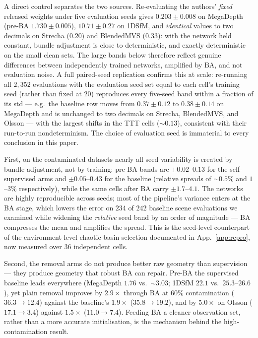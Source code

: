 \documentclass{article}
\begin{document}
A direct control separates the two sources. Re-evaluating the authors' \emph{fixed}
released weights under five evaluation seeds gives $0.203\pm0.008$ on MegaDepth
(pre-BA $1.730\pm0.005$), $10.71\pm0.27$ on 1DSfM, and \emph{identical} values to two
decimals on Strecha ($0.20$) and BlendedMVS ($0.33$): with the network held constant,
bundle adjustment is close to deterministic, and exactly deterministic on the small
clean sets. The large bands below therefore reflect genuine differences between
independently trained networks, amplified by BA, and not evaluation noise. A full
paired-seed replication confirms this at scale: re-running all $2{,}352$ evaluations with
the evaluation seed set equal to each cell's training seed (rather than fixed at $20$)
reproduces every five-seed band within a fraction of its std --- e.g.\ the baseline row
moves from $0.37\pm0.12$ to $0.38\pm0.14$ on MegaDepth and is unchanged to two decimals
on Strecha, BlendedMVS, and Olsson --- with the largest shifts in the TTT cells
($\sim\!0.13$), consistent with their run-to-run nondeterminism. The choice of
evaluation seed is immaterial to every conclusion in this paper.

First, on the contaminated datasets nearly all seed variability is created by bundle
adjustment, not by training: pre-BA bands are $\pm0.02$--$0.13$ for the self-supervised
arms and $\pm0.05$--$0.43$ for the baseline (relative spreads of ${\sim}0.5\%$ and
$1$--$3\%$ respectively), while the same cells after BA carry $\pm1.7$--$4.1$. The
networks are highly reproducible across seeds; most of the pipeline's variance enters at
the BA stage, which lowers the error on $234$ of $242$ baseline scene evaluations we
examined while widening the \emph{relative} seed band by an order of magnitude --- BA
compresses the mean and amplifies the spread. This is the seed-level counterpart of the
environment-level chaotic basin selection documented in App.~\ref{app:repro}, now
measured over $36$ independent cells.

Second, the removal arms do not produce better raw geometry than supervision --- they
produce geometry that robust BA can repair. Pre-BA the supervised baseline leads
everywhere (MegaDepth $1.76$ vs.\ ${\sim}3.03$; 1DSfM $22.1$ vs.\ $25.3$--$26.6$), yet
plain removal improves by $2.9\times$ through BA at $60\%$ contamination
($36.3\to12.4$) against the baseline's $1.9\times$ ($35.8\to19.2$), and by $5.0\times$
on Olsson ($17.1\to3.4$) against $1.5\times$ ($11.0\to7.4$). Feeding BA a cleaner
observation set, rather than a more accurate initialisation, is the mechanism behind the
high-contamination result.
\end{document}
